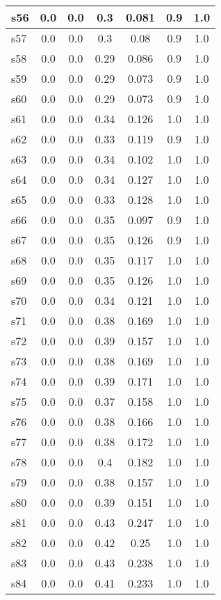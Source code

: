 \documentclass{article}
\begin{document}
\begin{tabular}{|l|c|c|c|c|c|c|}
\hline
s56 &0.0 & 0.0 & 0.3 & 0.081 & 0.9 & 1.0\\
\hline
s57 &0.0 & 0.0 & 0.3 & 0.08 & 0.9 & 1.0\\
\hline
s58 &0.0 & 0.0 & 0.29 & 0.086 & 0.9 & 1.0\\
\hline
s59 &0.0 & 0.0 & 0.29 & 0.073 & 0.9 & 1.0\\
\hline
s60 &0.0 & 0.0 & 0.29 & 0.073 & 0.9 & 1.0\\
\hline
s61 &0.0 & 0.0 & 0.34 & 0.126 & 1.0 & 1.0\\
\hline
s62 &0.0 & 0.0 & 0.33 & 0.119 & 0.9 & 1.0\\
\hline
s63 &0.0 & 0.0 & 0.34 & 0.102 & 1.0 & 1.0\\
\hline
s64 &0.0 & 0.0 & 0.34 & 0.127 & 1.0 & 1.0\\
\hline
s65 &0.0 & 0.0 & 0.33 & 0.128 & 1.0 & 1.0\\
\hline
s66 &0.0 & 0.0 & 0.35 & 0.097 & 0.9 & 1.0\\
\hline
s67 &0.0 & 0.0 & 0.35 & 0.126 & 0.9 & 1.0\\
\hline
s68 &0.0 & 0.0 & 0.35 & 0.117 & 1.0 & 1.0\\
\hline
s69 &0.0 & 0.0 & 0.35 & 0.126 & 1.0 & 1.0\\
\hline
s70 &0.0 & 0.0 & 0.34 & 0.121 & 1.0 & 1.0\\
\hline
s71 &0.0 & 0.0 & 0.38 & 0.169 & 1.0 & 1.0\\
\hline
s72 &0.0 & 0.0 & 0.39 & 0.157 & 1.0 & 1.0\\
\hline
s73 &0.0 & 0.0 & 0.38 & 0.169 & 1.0 & 1.0\\
\hline
s74 &0.0 & 0.0 & 0.39 & 0.171 & 1.0 & 1.0\\
\hline
s75 &0.0 & 0.0 & 0.37 & 0.158 & 1.0 & 1.0\\
\hline
s76 &0.0 & 0.0 & 0.38 & 0.166 & 1.0 & 1.0\\
\hline
s77 &0.0 & 0.0 & 0.38 & 0.172 & 1.0 & 1.0\\
\hline
s78 &0.0 & 0.0 & 0.4 & 0.182 & 1.0 & 1.0\\
\hline
s79 &0.0 & 0.0 & 0.38 & 0.157 & 1.0 & 1.0\\
\hline
s80 &0.0 & 0.0 & 0.39 & 0.151 & 1.0 & 1.0\\
\hline
s81 &0.0 & 0.0 & 0.43 & 0.247 & 1.0 & 1.0\\
\hline
s82 &0.0 & 0.0 & 0.42 & 0.25 & 1.0 & 1.0\\
\hline
s83 &0.0 & 0.0 & 0.43 & 0.238 & 1.0 & 1.0\\
\hline
s84 &0.0 & 0.0 & 0.41 & 0.233 & 1.0 & 1.0\\

\end{tabular}
\end{document}
